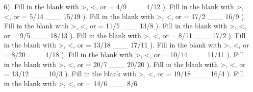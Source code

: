 \documentclass{article}%
\begin{document}
6). Fill in the blank with >, <, or = 4/9 \_\_\_ 4/12%
\newline%
\newline%
). Fill in the blank with >, <, or = 5/14 \_\_\_ 15/19%
\newline%
\newline%
). Fill in the blank with >, <, or = 17/2 \_\_\_ 16/9%
\newline%
\newline%
). Fill in the blank with >, <, or = 11/5 \_\_\_ 13/8%
\newline%
\newline%
). Fill in the blank with >, <, or = 9/5 \_\_\_ 18/13%
\newline%
\newline%
). Fill in the blank with >, <, or = 8/11 \_\_\_ 17/2%
\newline%
\newline%
). Fill in the blank with >, <, or = 13/18 \_\_\_ 17/11%
\newline%
\newline%
). Fill in the blank with >, <, or = 8/20 \_\_\_ 4/18%
\newline%
\newline%
). Fill in the blank with >, <, or = 10/14 \_\_\_ 11/11%
\newline%
\newline%
). Fill in the blank with >, <, or = 20/7 \_\_\_ 20/20%
\newline%
\newline%
). Fill in the blank with >, <, or = 13/12 \_\_\_ 10/3%
\newline%
\newline%
). Fill in the blank with >, <, or = 19/18 \_\_\_ 16/4%
\newline%
\newline%
). Fill in the blank with >, <, or = 14/6 \_\_\_ 8/6%
\newline%
\newline%
\end{document}
